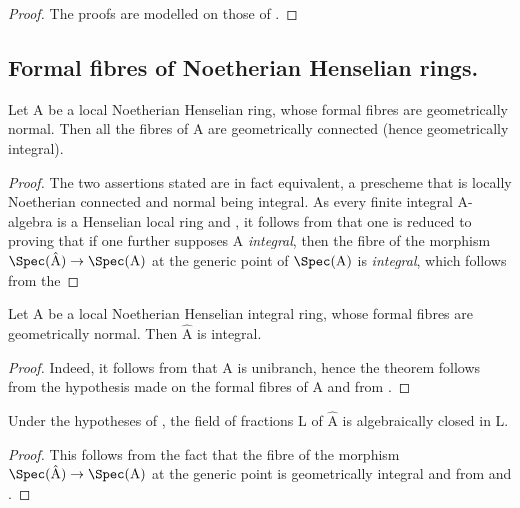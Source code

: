 \begin{proof}
The proofs are modelled on those of .
\end{proof}



\subsection{Formal fibres of Noetherian Henselian rings.}
\label{subsection:IV.18.9}

\begin{theorem}[18.9.1]
\label{IV.18.9.1}
Let $\mathrm{A}$ be a local Noetherian Henselian ring, whose formal fibres are geometrically normal.
Then all the fibres of $\mathrm{A}$ are geometrically connected (hence geometrically integral).
\end{theorem}

\begin{proof}
The two assertions stated are in fact equivalent, a prescheme that is locally Noetherian connected and normal being integral.
As every finite integral A-algebra is a Henselian local ring  and , it follows from  that one is reduced to proving that if one further supposes A \emph{integral}, then the fibre of the morphism $\Spec(\hat{\mathrm{A}})\to\Spec(\mathrm{A})$ at the generic point of $\Spec(\mathrm{A})$ is \emph{integral}, which follows from the
\end{proof}

\begin{corollary}[18.9.2]
\label{IV.18.9.2}
Let $\mathrm{A}$ be a local Noetherian Henselian integral ring, whose formal fibres are geometrically normal.
Then $\hat{\mathrm{A}}$ is integral.
\end{corollary}

\begin{proof}
Indeed, it follows from  that A is unibranch, hence the theorem follows from the hypothesis made on the formal fibres of A and from .
\end{proof}

\begin{corollary}[18.9.3]
\label{IV.18.9.3}
Under the hypotheses of , the field of fractions L of $\hat{\mathrm{A}}$ is algebraically closed in L.
\end{corollary}

\begin{proof}
This follows from the fact that the fibre of the morphism $\Spec(\hat{\mathrm{A}})\to\Spec(\mathrm{A})$ at the generic point is geometrically integral and from  and .
\end{proof}

